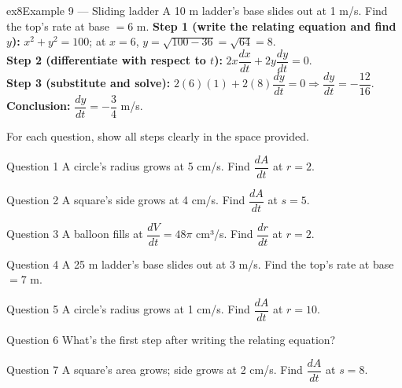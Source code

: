 \documentclass[11pt]{article}
\begin{document}
\begin{example}{ex8}{Example 9 --- Sliding ladder}
A 10 m ladder's base slides out at 1 m/s. Find the top's rate at base $=6$ m.\soln
\textbf{Step 1 (write the relating equation and find $y$):} $x^2+y^2=100$; at $x=6$, $y=\sqrt{100-36}=\sqrt{64}=8$.\\[3pt]
\textbf{Step 2 (differentiate with respect to $t$):} $2x\dfrac{dx}{dt}+2y\dfrac{dy}{dt}=0$.\\[3pt]
\textbf{Step 3 (substitute and solve):} $2(6)(1)+2(8)\dfrac{dy}{dt}=0\Rightarrow\dfrac{dy}{dt}=-\dfrac{12}{16}$.\\[3pt]
\textbf{Conclusion:} $\dfrac{dy}{dt}=-\dfrac34$ m/s.
\end{example}

\clearpage
{}
For each question, show all steps clearly in the space provided.

\begin{qbox}{Question 1}
A circle's radius grows at 5 cm/s. Find $\dfrac{dA}{dt}$ at $r=2$.\workspace{2.4cm}
\end{qbox}

\begin{qbox}{Question 2}
A square's side grows at 4 cm/s. Find $\dfrac{dA}{dt}$ at $s=5$.\workspace{2.4cm}
\end{qbox}

\begin{qbox}{Question 3}
A balloon fills at $\dfrac{dV}{dt}=48\pi$ cm³/s. Find $\dfrac{dr}{dt}$ at $r=2$.\workspace{2.4cm}
\end{qbox}

\begin{qbox}{Question 4}
A 25 m ladder's base slides out at 3 m/s. Find the top's rate at base $=7$ m.\workspace{2.4cm}
\end{qbox}

\begin{qbox}{Question 5}
A circle's radius grows at 1 cm/s. Find $\dfrac{dA}{dt}$ at $r=10$.\workspace{2.4cm}
\end{qbox}

\begin{qbox}{Question 6}
What's the first step after writing the relating equation?\workspace{2.4cm}
\end{qbox}

\begin{qbox}{Question 7}
A square's area grows; side grows at 2 cm/s. Find $\dfrac{dA}{dt}$ at $s=8$.\workspace{2.4cm}
\end{qbox}
\end{document}
